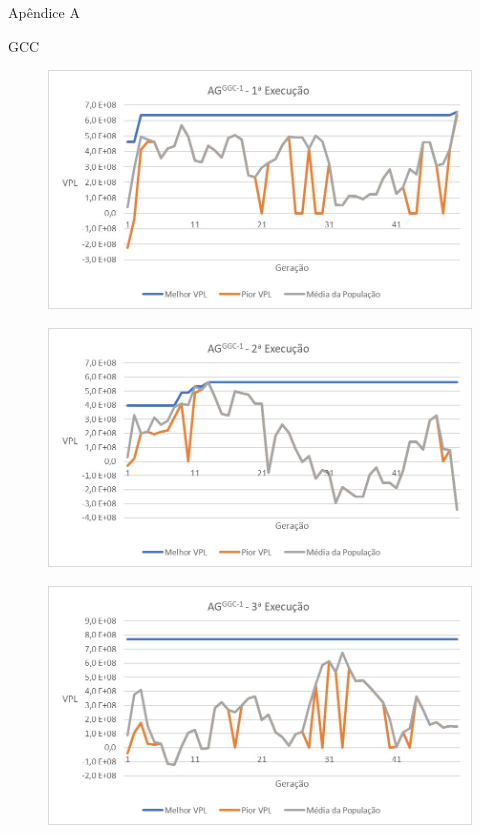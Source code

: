 \documentclass[12pt,a4paper]{report}
\begin{document}
Apêndice A

GCC

\begin{figure}[H]
\centering

\includegraphics[scale=1]{GCC/1}
\end{figure}

\begin{figure}[H]
\centering

\includegraphics[scale=1]{GCC/2}
\end{figure}

\begin{figure}[H]
\centering

\includegraphics[scale=1]{GCC/3}
\end{figure}
\end{document}
